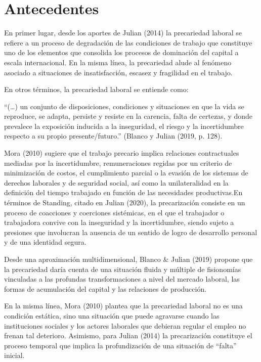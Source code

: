 \documentclass[
]{article}
\begin{document}
\hypertarget{antecedentes}{%
\section{Antecedentes}\label{antecedentes}}

En primer lugar, desde los aportes de Julian (2014) la precariedad
laboral se refiere a un proceso de degradación de las condiciones de
trabajo que constituye uno de los elementos que consolida los procesos
de dominación del capital a escala internacional. En la misma línea, la
precariedad alude al fenómeno asociado a situaciones de insatisfacción,
escasez y fragilidad en el trabajo.

En otros términos, la precariedad laboral se entiende como:

``(\ldots) un conjunto de disposiciones, condiciones y situaciones en
que la vida se reproduce, se adapta, persiste y resiste en la carencia,
falta de certezas, y donde prevalece la exposición inducida a la
inseguridad, el riesgo y la incertidumbre respecto a su propio
presente/futuro.'' (Blanco y Julian (2019, p. 128).

Mora (2010) sugiere que el trabajo precario implica relaciones
contractuales mediadas por la incertidumbre, remuneraciones regidas por
un criterio de minimización de costos, el cumplimiento parcial o la
evasión de los sistemas de derechos laborales y de seguridad social, así
como la unilateralidad en la definición del tiempo trabajado en función
de las necesidades productivas.En términos de Standing, citado en Julian
(2020), la precarización consiste en un proceso de coacciones y
coerciones sistémicas, en el que el trabajador o trabajadora convive con
la inseguridad y la incertidumbre, siendo sujeto a presiones que
involucran la ausencia de un sentido de logro de desarrollo personal y
de una identidad segura.

Desde una aproximación multidimensional, Blanco \& Julian (2019) propone
que la precariedad daría cuenta de una situación fluida y múltiple de
fisionomías vinculadas a las profundas transformaciones a nivel del
mercado laboral, las formas de acumulación del capital y las relaciones
de producción.

En la misma línea, Mora (2010) plantea que la precariedad laboral no es
una condición estática, sino una situación que puede agravarse cuando
las instituciones sociales y los actores laborales que debieran regular
el empleo no frenan tal deterioro. Asimismo, para Julian (2014) la
precarización constituye el proceso temporal que implica la
profundización de una situación de ``falta'' inicial.
\end{document}
